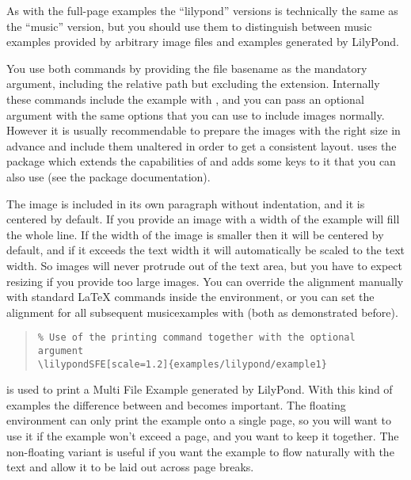 \documentclass[../openLilyLib]{subfiles}
\begin{document}
As with the full-page examples the “lilypond” versions is technically the same as the “music” version, but you should use them to distinguish between music examples provided by arbitrary image files and examples generated by LilyPond.
\\

You use both commands by providing the file basename as the mandatory argument, including the relative path but excluding the extension.
Internally these commands include the example with , and you can pass an optional argument with the same options that you can use to include images normally.
However it is usually recommendable to prepare the images with the right size in advance and include them unaltered in order to get a consistent layout.
 uses the  package which extends the capabilities of  and adds some keys to it that you can also use (see the package documentation).

The image is included in its own paragraph without indentation, and it is centered by default.
If you provide an image with a width of  the example will fill the whole line.
If the width of the image is smaller then it will be centered by default, and if it exceeds the text width it will automatically be scaled to the text width.
So images will never protrude out of the text area, but you have to expect resizing if you provide too large images.
You can override the alignment manually with standard LaTeX commands inside the environment, or you can set the alignment for all subsequent musicexamples with  (both as demonstrated before).

\begin{quote}
\begin{verbatim}
% Use of the printing command together with the optional argument
\lilypondSFE[scale=1.2]{examples/lilypond/example1}
\end{verbatim}
\end{quote}

 is used to print a Multi File Example generated by LilyPond.
With this kind of examples the difference between  and  becomes important.
The floating environment can only print the example onto a single page, so you will want to use it if the example won't exceed a page, and you want to keep it together.
The non-floating variant is useful if you want the example to flow naturally with the text and allow it to be laid out across page breaks.
\end{document}
